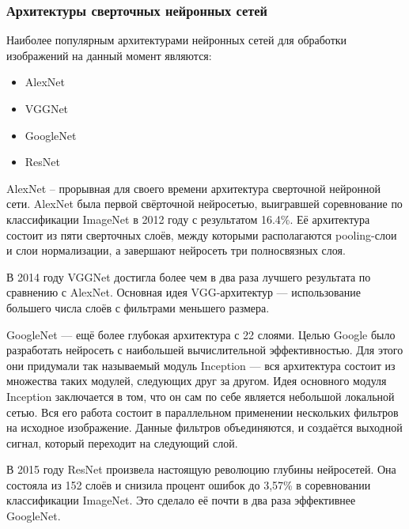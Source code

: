 \documentclass[a4paper,14pt]{article}
\begin{document}
\subsubsection{Архитектуры сверточных нейронных сетей}

Наиболее популярным архитектурами нейронных сетей для обработки изображений на данный момент являются:
\begin{itemize}
	\item AlexNet
	\item VGGNet
	\item GoogleNet
	\item ResNet
\end{itemize}

AlexNet -- прорывная для своего времени архитектура сверточной нейронной сети.
AlexNet была первой свёрточной нейросетью, выигравшей соревнование по классификации ImageNet в 2012 году с результатом 16.4\%.
Её архитектура состоит из пяти сверточных слоёв, между которыми располагаются pooling-слои и слои нормализации, а завершают нейросеть три полносвязных слоя.

В 2014 году VGGNet достигла более чем в два раза лучшего результата по сравнению с AlexNet.
Основная идея VGG-архитектур — использование большего числа слоёв с фильтрами меньшего размера.

GoogleNet — ещё более глубокая архитектура с 22 слоями.
Целью Google было разработать нейросеть с наибольшей вычислительной эффективностью.
Для этого они придумали так называемый модуль Inception — вся архитектура состоит из множества таких модулей, следующих друг за другом.
Идея основного модуля Inception заключается в том, что он сам по себе является небольшой локальной сетью.
Вся его работа состоит в параллельном применении нескольких фильтров на исходное изображение.
Данные фильтров объединяются, и создаётся выходной сигнал, который переходит на следующий слой.

В 2015 году ResNet произвела настоящую революцию глубины нейросетей.
Она состояла из 152 слоёв и снизила процент ошибок до 3,57\% в соревновании классификации ImageNet.
Это сделало её почти в два раза эффективнее GoogleNet.
\end{document}
